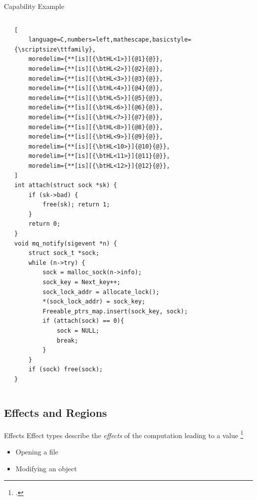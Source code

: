 \documentclass[aspectratio=169]{beamer}
\begin{document}
\begin{frame}[fragile]{Capability Example}

\begin{columns}[T]
\begin{column}{0.48\textwidth}
\end{column}
\begin{column}{0.48\textwidth}
\begin{lstlisting}[
    language=C,numbers=left,mathescape,basicstyle={\scriptsize\ttfamily},
    moredelim={**[is][{\btHL<1>}]{@1}{@}},
    moredelim={**[is][{\btHL<2>}]{@2}{@}},
    moredelim={**[is][{\btHL<3>}]{@3}{@}},
    moredelim={**[is][{\btHL<4>}]{@4}{@}},
    moredelim={**[is][{\btHL<5>}]{@5}{@}},
    moredelim={**[is][{\btHL<6>}]{@6}{@}},
    moredelim={**[is][{\btHL<7>}]{@7}{@}},
    moredelim={**[is][{\btHL<8>}]{@8}{@}},
    moredelim={**[is][{\btHL<9>}]{@9}{@}},
    moredelim={**[is][{\btHL<10>}]{@10}{@}},
    moredelim={**[is][{\btHL<11>}]{@11}{@}},
    moredelim={**[is][{\btHL<12>}]{@12}{@}},
]
int attach(struct sock *sk) {
    if (sk->bad) {
        free(sk); return 1;
    }
    return 0;
}
void mq_notify(sigevent *n) {
    struct sock_t *sock;
    while (n->try) {
        sock = malloc_sock(n->info);
        sock_key = Next_key++;
        sock_lock_addr = allocate_lock();
        *(sock_lock_addr) = sock_key;
        Freeable_ptrs_map.insert(sock_key, sock);
        if (attach(sock) == 0){
            sock = NULL;
            break;
        }
    }
    if (sock) free(sock);
}
\end{lstlisting}
\end{column}
\end{columns}
\end{frame}

\subsection{Effects and Regions}


\begin{frame}{Effects}
    Effect types describe the \emph{effects} of the computation leading to a value \footcite{pierce_advanced_2005}
    \\
    \begin{itemize}
        \item Opening a file
        \item Modifying an object
    \end{itemize}
\end{frame}
\end{document}
